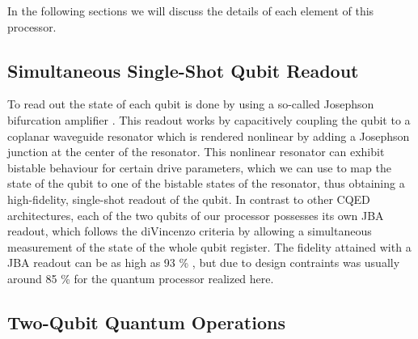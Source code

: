 In the following sections we will discuss the details of each element of this processor.

\subsection{Simultaneous Single-Shot Qubit Readout}

To read out the state of each qubit is done by using a so-called Josephson bifurcation amplifier \citep{siddiqi_dispersive_2006,mallet_single-shot_2009}. This readout works by capacitively coupling the qubit to a coplanar waveguide resonator which is rendered nonlinear by adding a Josephson junction at the center of the resonator. This nonlinear resonator can exhibit bistable behaviour for certain drive parameters, which we can use to map the state of the qubit to one of the bistable states of the resonator, thus obtaining a high-fidelity, single-shot readout of the qubit. In contrast to other CQED architectures, each of the two qubits of our processor possesses its own JBA readout, which follows the diVincenzo criteria by allowing a simultaneous measurement of the state of the whole qubit register. The fidelity attained with a JBA readout can be as high as 93 \% \citep{mallet_single-shot_2009}, but due to design contraints was usually around 85 \% for the quantum processor realized here.

\subsection{Two-Qubit Quantum Operations}

